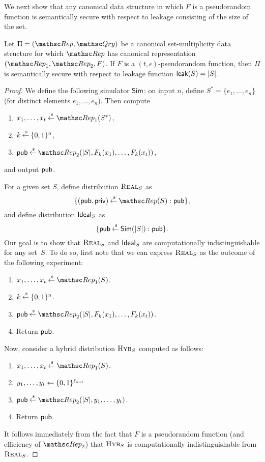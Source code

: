 We next show that any canonical data structure in which $F$ is a pseudorandom function is
semantically secure with respect to leakage consisting of the size of the set.

\begin{theorem}
Let $\Pi=(\Rep, \Qry)$ be a canonical set-multiplicity data structure for which $\Rep$ has canonical representation
$(\Rep_1, \Rep_2, F)$. If $F$ is a $(t, \epsilon)$-pseudorandom function, then $\Pi$
is semantically secure with respect to leakage function ${\sf leak}(S) = |S|$.
\end{theorem}
\begin{proof}
We define the following simulator ${\sf Sim}$: on input $n$, define $S^*=\{e_1, \ldots, e_n\}$
(for distinct elements $e_1, \ldots, e_n$). Then compute
\begin{enumerate}
\item $x_1, \ldots, x_t \getsr \Rep_1(S^*)$,
\item $k {\:\stackrel{{\scriptscriptstyle \hspace{0.2em}\$}} {\leftarrow}\:} \{0,1\}^n$,
\item $\pubaux \getsr \Rep_2(|S|, F_k(x_1), \ldots, F_k(x_t))$,
\end{enumerate}
and output ${\sf pub}$.

\def\hyb{\mbox{{\sc Hyb}}}

For a given set $S$, define distribution $\mbox{{\sc Real}}_S$ as
\[ \{ (\pubaux, \privaux) \getsr \Rep(S) : \pubaux\},\]
and define distribution $\mbox{{\sf Ideal}}_S$ as
\[ \{ {\sf pub} {\:\stackrel{{\scriptscriptstyle \hspace{0.2em}\$}} {\leftarrow}\:} {\sf Sim}(|S|) : {\sf pub} \}.\]
Our goal is to show that $\mbox{{\sc Real}}_S$ and $\mbox{{\sf Ideal}}_S$ are computationally
indistinguishable for any set~$S$. 
To do so, first note that we can express $\mbox{{\sc Real}}_S$ as the outcome of
the following experiment:
\begin{enumerate}
\item $x_1, \ldots, x_t \getsr \Rep_1(S)$.
\item $k {\:\stackrel{{\scriptscriptstyle \hspace{0.2em}\$}} {\leftarrow}\:} \{0,1\}^n$.
\item $\pubaux \getsr \Rep_2(|S|, F_k(x_1), \ldots, F_k(x_t))$.
\item Return ${\sf pub}$.
\end{enumerate}

Now, consider a hybrid distribution $\hyb_S$ computed as follows:
\begin{enumerate}
\item $x_1, \ldots, x_t \getsr \Rep_1(S)$.
\item $y_1, \ldots, y_t \leftarrow \{0,1\}^{\ell_{out}}$
\item $\pubaux \getsr \Rep_2(|S|, y_1, \ldots, y_t)$.
\item Return ${\sf pub}$.
\end{enumerate}
It follows immediately from the fact that $F$ is a pseudorandom function (and efficiency
of $\Rep_2$) that $\hyb_S$ is computationally indistinguishable from $\mbox{{\sc Real}}_S$.


\end{proof}
